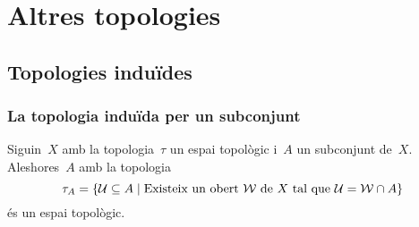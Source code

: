 \documentclass[../../main.tex]{subfiles}
\begin{document}
\chapter{Altres topologies}
\section{Topologies induïdes}
    \subsection{La topologia induïda per un subconjunt}
    \begin{proposition}
        \label{prop:topologia induida per un subconjunt}
        Siguin~\(X\) amb la topologia~\(\tau\) un espai topològic i~\(A\) un subconjunt de~\(X\).
        Aleshores~\(A\) amb la topologia
        \begin{equation}
            \label{prop:topologia induida per un subconjunt:eq1}
            \tau_{A}=\{\mathcal{U}\subseteq A\mid\text{Existeix un obert }\mathcal{W}\text{ de }X\text{ tal que }\mathcal{U}=\mathcal{W}\cap A\}
        \end{equation}
        és un espai topològic.
    \end{proposition}
\end{document}
